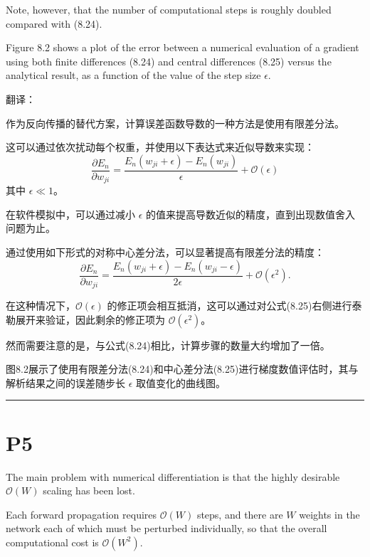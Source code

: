 \documentclass{article}
\begin{document}
Note, however, that the number of computational steps is roughly doubled compared with (8.24). 

Figure 8.2 shows a plot of the error between a numerical evaluation of a gradient using both finite differences (8.24) and central differences (8.25) versus the analytical result, as a function of the value of the step size $\epsilon$.

{\color{red}
翻译：

作为反向传播的替代方案，计算误差函数导数的一种方法是使用有限差分法。

这可以通过依次扰动每个权重，并使用以下表达式来近似导数来实现：
\begin{equation}
\frac{\partial E_n}{\partial w_{ji}} = \frac{E_n(w_{ji} + \epsilon) - E_n(w_{ji})}{\epsilon} + \mathcal{O}(\epsilon) \tag{8.24}
\end{equation}
其中 $\epsilon \ll 1$。

在软件模拟中，可以通过减小 $\epsilon$ 的值来提高导数近似的精度，直到出现数值舍入问题为止。

通过使用如下形式的对称中心差分法，可以显著提高有限差分法的精度：
\begin{equation}
\frac{\partial E_n}{\partial w_{ji}} = \frac{E_n(w_{ji} + \epsilon) - E_n(w_{ji} - \epsilon)}{2\epsilon} + \mathcal{O}(\epsilon^2). 
\tag{8.25}
\end{equation}

在这种情况下，$\mathcal{O}(\epsilon)$ 的修正项会相互抵消，这可以通过对公式(8.25)右侧进行泰勒展开来验证，因此剩余的修正项为 $\mathcal{O}(\epsilon^2)$。

然而需要注意的是，与公式(8.24)相比，计算步骤的数量大约增加了一倍。

图8.2展示了使用有限差分法(8.24)和中心差分法(8.25)进行梯度数值评估时，其与解析结果之间的误差随步长 $\epsilon$ 取值变化的曲线图。
}

\noindent\rule{\linewidth}{0.4pt}

\section{P5}

The main problem with numerical differentiation is that the highly desirable $\mathcal{O}(W)$ scaling has been lost. 

Each forward propagation requires $\mathcal{O}(W)$ steps, and there are $W$ weights in the network each of which must be perturbed individually, so that the overall computational cost is $\mathcal{O}(W^2)$.
\end{document}
